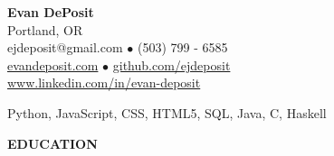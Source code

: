 \documentclass[11pt]{article}
\begin{document}
\thispagestyle{empty}
\begin{center}
\noindent \Large{\textbf{Evan DePosit}}\\
\large{Portland, OR}\\
\large{ejdeposit@gmail.com $\bullet$ (503) 799 - 6585}\\
\href{http://evandeposit.com}{\large{evandeposit.com}} $\bullet$
\href{http://github.com/ejdeposit}{\large{github.com/ejdeposit}}\\
\href{http://www.linkedin.com/in/evan-deposit}{\large{www.linkedin.com/in/evan-deposit}}
\end{center}
\medskip
\begin{description}[style=multiline,leftmargin=3.2cm,font=\normalfont]
\item[\textbf{LANGUAGES:}] Python, JavaScript, CSS, HTML5, SQL, Java, C,  Haskell
\end{description}
\noindent
\makebox[0pt][l]{\rule[-.2\baselineskip]{\linewidth}{.3mm}}%
\large{\textbf{EDUCATION}} \smallskip \\
\end{document}
